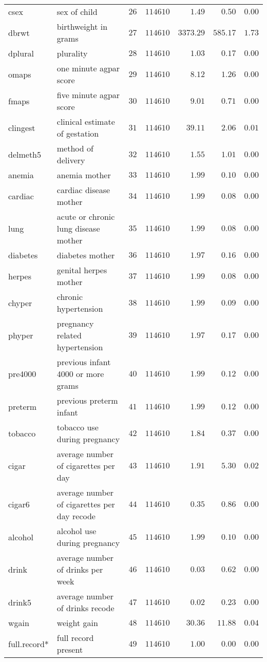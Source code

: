 \begin{table}[!tbp]
\begin{center}
\begin{tabular}{llrrrrr}
csex&sex of child&$26$&$114610$&$   1.49$&$  0.50$&$0.00$\tabularnewline
dbrwt&birthweight in grams&$27$&$114610$&$3373.29$&$585.17$&$1.73$\tabularnewline
dplural&plurality&$28$&$114610$&$   1.03$&$  0.17$&$0.00$\tabularnewline
omaps&one minute agpar score&$29$&$114610$&$   8.12$&$  1.26$&$0.00$\tabularnewline
fmaps&five minute agpar score&$30$&$114610$&$   9.01$&$  0.71$&$0.00$\tabularnewline
clingest&clinical estimate of gestation&$31$&$114610$&$  39.11$&$  2.06$&$0.01$\tabularnewline
delmeth5&method of delivery&$32$&$114610$&$   1.55$&$  1.01$&$0.00$\tabularnewline
anemia&anemia mother&$33$&$114610$&$   1.99$&$  0.10$&$0.00$\tabularnewline
cardiac&cardiac disease mother&$34$&$114610$&$   1.99$&$  0.08$&$0.00$\tabularnewline
lung&acute or chronic lung disease mother&$35$&$114610$&$   1.99$&$  0.08$&$0.00$\tabularnewline
diabetes&diabetes mother&$36$&$114610$&$   1.97$&$  0.16$&$0.00$\tabularnewline
herpes&genital herpes mother&$37$&$114610$&$   1.99$&$  0.08$&$0.00$\tabularnewline
chyper&chronic hypertension&$38$&$114610$&$   1.99$&$  0.09$&$0.00$\tabularnewline
phyper&pregnancy related hypertension&$39$&$114610$&$   1.97$&$  0.17$&$0.00$\tabularnewline
pre4000&previous infant 4000 or more grams&$40$&$114610$&$   1.99$&$  0.12$&$0.00$\tabularnewline
preterm&previous preterm infant&$41$&$114610$&$   1.99$&$  0.12$&$0.00$\tabularnewline
tobacco&tobacco use during pregnancy&$42$&$114610$&$   1.84$&$  0.37$&$0.00$\tabularnewline
cigar&average number of cigarettes per day&$43$&$114610$&$   1.91$&$  5.30$&$0.02$\tabularnewline
cigar6&average number of cigarettes per day recode&$44$&$114610$&$   0.35$&$  0.86$&$0.00$\tabularnewline
alcohol&alcohol use during pregnancy&$45$&$114610$&$   1.99$&$  0.10$&$0.00$\tabularnewline
drink&average number of drinks per week&$46$&$114610$&$   0.03$&$  0.62$&$0.00$\tabularnewline
drink5&average number of drinks recode&$47$&$114610$&$   0.02$&$  0.23$&$0.00$\tabularnewline
wgain&weight gain&$48$&$114610$&$  30.36$&$ 11.88$&$0.04$\tabularnewline
full.record*&full record present&$49$&$114610$&$   1.00$&$  0.00$&$0.00$\tabularnewline
\hline
\end{tabular}
\end{center}
\end{table}

